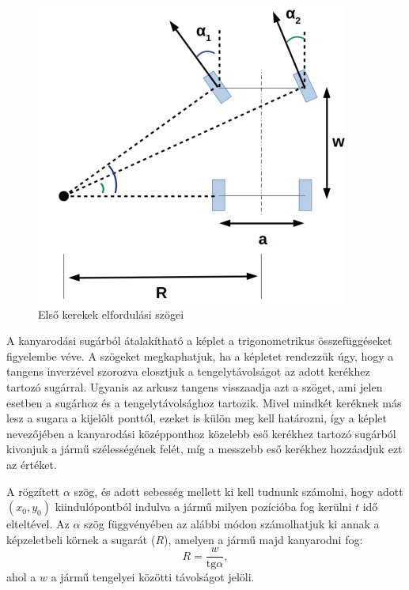 \begin{figure}[h!]
\centering
\includegraphics[scale=0.5]{images/turning_vehicle.png}
\caption{Első kerekek elfordulási szögei}
\label{fig:turning_vehicle}
\end{figure}
\vspace{5mm}


A kanyarodási sugárból átalakítható a képlet a trigonometrikus összefüggéseket figyelembe véve. A szögeket megkaphatjuk, ha a képletet rendezzük úgy, hogy a tangens inverzével szorozva elosztjuk a tengelytávolságot az adott kerékhez tartozó sugárral. Ugyanis az arkusz tangens visszaadja azt a szöget, ami jelen esetben a sugárhoz és a tengelytávolsághoz tartozik. Mivel mindkét keréknek más lesz a sugara a kijelölt ponttól, ezeket is külön meg kell határozni, így a képlet nevezőjében a kanyarodási középponthoz közelebb eső kerékhez tartozó sugárból kivonjuk a jármű szélességének felét, míg a messzebb eső kerékhez hozzáadjuk ezt az értéket.



A rögzített $\alpha$ szög, és adott sebesség mellett ki kell tudnunk számolni, hogy adott $(x_0, y_0)$ kiindulópontból indulva a jármű milyen pozícióba fog kerülni $t$ idő elteltével. Az $\alpha$ szög függvényében az alábbi módon számolhatjuk ki annak a képzeletbeli körnek a sugarát ($R$), amelyen a jármű majd kanyarodni fog:
\[
R = \dfrac{w}{\text{tg} \alpha},
\]
ahol a $w$ a jármű tengelyei közötti távolságot jelöli.

